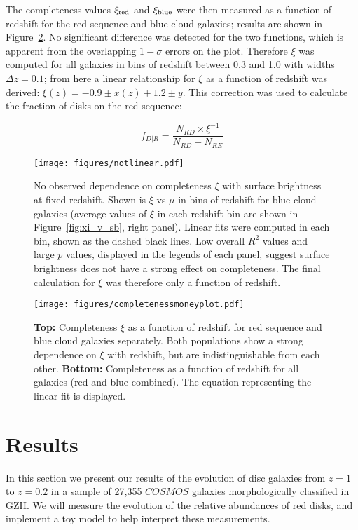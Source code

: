 The completeness values $\rm \xi_{red}$ and $\rm \xi_{blue}$ were then measured as a function of redshift for the red sequence and blue cloud  galaxies; results are shown in Figure~\ref{fig:xi}. No significant difference was detected for the two functions, which is apparent from the overlapping $1-\sigma$ errors on the plot. Therefore $\xi$ was computed for all galaxies in bins of redshift between 0.3 and 1.0 with widths $\Delta z = 0.1$; from here a linear relationship for $\xi$ as a function of redshift was derived: $\xi(z) = -0.9 \pm x (z) + 1.2 \pm y$. This correction was used to calculate the fraction of disks on the red sequence:

\begin{equation}
f_{D|R}=\frac{N_{RD}\times \xi^{-1}}{N_{RD} + N_{RE}}
\label{eqn:frid}
\end{equation}

\begin{figure}
\centering
\texttt{[image: figures/notlinear.pdf]}
\caption{No observed dependence on completeness $\xi$ with surface brightness at fixed redshift. Shown is $\xi$ vs $\mu$ in bins of redshift for blue cloud galaxies (average values of $\xi$ in each redshift bin are shown in Figure~\ref{fig:xi_v_sb}, right panel). Linear fits were computed in each bin, shown as the dashed black lines. Low overall $R^2$ values and large $p$ values, displayed in the legends of each panel, suggest surface brightness does not have a strong effect on completeness. The final calculation for $\xi$ was therefore only a function of redshift.  }

\label{fig:notlinear}
\end{figure}


\begin{figure}
\centering
\texttt{[image: figures/completenessmoneyplot.pdf]}
\caption{\textbf{Top:} Completeness $\xi$ as a function of redshift for red sequence and blue cloud  galaxies separately. Both populations show a strong dependence on $\xi$ with redshift, but are indistinguishable from each other. \textbf{Bottom:} Completeness as a function of redshift for all   galaxies (red and blue combined). The equation representing the linear fit is displayed.}
\label{fig:xi}
\end{figure}

\section{Results}
\label{sec:results}
In this section we present our results of the evolution of disc galaxies from $z=1$ to $z=0.2$ in a sample of 27,355 $COSMOS$ galaxies morphologically classified in GZH. We will measure the evolution of the relative abundances of red disks, and implement a toy model to help interpret these measurements. 

